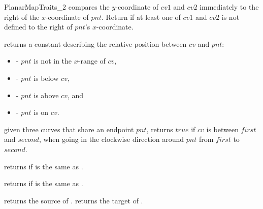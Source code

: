 \begin{ccRefConcept}{PlanarMapTraits_2}
   {compares the $y$-coordinate of $cv1$ and
     $cv2$ immediately to the right of the $x$-coordinate of $pnt$.
     Return  if at least one of $cv1$ and $cv2$ is
     not defined to the right of $pnt$'s $x$-coordinate.}

    
     {returns a constant describing the
       relative position between $cv$ and $pnt$:
       \begin{itemize}
       \item[] - $pnt$ is not in the $x$-range of
       $cv$, 
       \item[] - $pnt$ is below $cv$,
       \item[] - $pnt$ is above $cv$, and
       \item[] - $pnt$ is on $cv$.
       \end{itemize}}
       
        {given three curves that share an endpoint $pnt$,
          returns $true$ if $cv$ is between $first$ and $second$, when
          going in the clockwise direction around $pnt$ from $first$
          to $second$. }


       {returns  if  is the same as .}

       {returns  if  is the same as .}
	  

             {returns the source of .}
             {returns the target of .}



\end{ccRefConcept}
